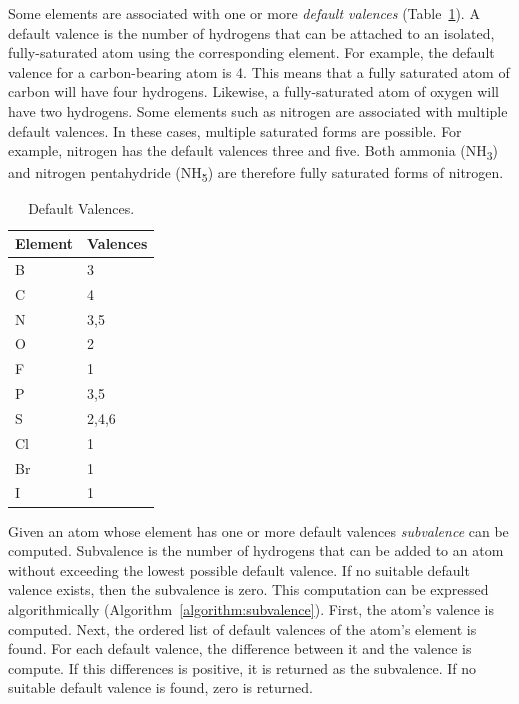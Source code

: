 \documentclass{article}
\begin{document}
Some elements are associated with one or more \textit{default valences} (Table~\ref{table:default-valences}). A default valence is the number of hydrogens that can be attached to an isolated, fully-saturated atom using the corresponding element. For example, the default valence for a carbon-bearing atom is 4. This means that a fully saturated atom of carbon will have four hydrogens. Likewise, a fully-saturated atom of oxygen will have two hydrogens. Some elements such as nitrogen are associated with multiple default valences. In these cases, multiple saturated forms are possible. For example, nitrogen has the default valences three and five. Both ammonia (NH\textsubscript{3}) and nitrogen pentahydride (NH\textsubscript{5}) are therefore fully saturated forms of nitrogen.

\begin{table}
    \caption{Default Valences.}
    \centering
    \begin{tabular}{l l}
        \hline
        Element & Valences \\
        \hline
        B & 3 \\
        C & 4 \\
        N & 3,5 \\
        O & 2 \\
        F & 1 \\
        P & 3,5 \\
        S & 2,4,6 \\
        Cl & 1 \\
        Br & 1 \\
        I & 1 \\
        \hline
    \end{tabular}
    \label{table:default-valences}
\end{table}

Given an atom whose element has one or more default valences \textit{subvalence} can be computed. Subvalence is the number of hydrogens that can be added to an atom without exceeding the lowest possible default valence. If no suitable default valence exists, then the subvalence is zero. This computation can be expressed algorithmically (Algorithm~\ref{algorithm:subvalence}). First, the atom's valence is computed. Next, the ordered list of default valences of the atom's element is found. For each default valence, the difference between it and the valence is compute. If this differences is positive, it is returned as the subvalence. If no suitable default valence is found, zero is returned.
\end{document}

